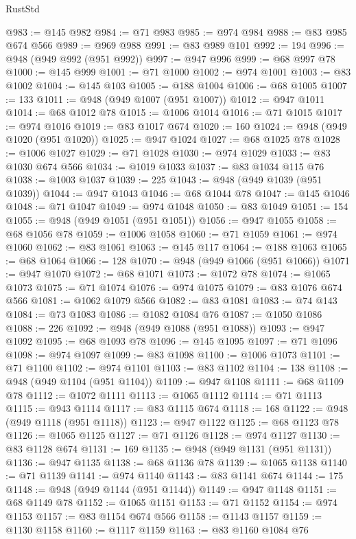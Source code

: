 \begin{lexlean}{RustStd}
\begin{coremodule}
{\begin{coremodule}
{{{{{{{{{{{{{{{{{{{{{{{{{{{{{{{{{{{@983 := @145 @982
@984 := @71 @983
@985 := @974 @984
@988 := @83 @985 @674 @566
@989 := @969 @988
@991 := @83 @989 @101
@992 := 194
@996 := @948 (@949 @992 (@951 @992))
@997 := @947 @996
@999 := @68 @997 @78
@1000 := @145 @999
@1001 := @71 @1000
@1002 := @974 @1001
@1003 := @83 @1002
@1004 := @145 @103
@1005 := @188 @1004
@1006 := @68 @1005
@1007 := 133
@1011 := @948 (@949 @1007 (@951 @1007))
@1012 := @947 @1011
@1014 := @68 @1012 @78
@1015 := @1006 @1014
@1016 := @71 @1015
@1017 := @974 @1016
@1019 := @83 @1017 @674
@1020 := 160
@1024 := @948 (@949 @1020 (@951 @1020))
@1025 := @947 @1024
@1027 := @68 @1025 @78
@1028 := @1006 @1027
@1029 := @71 @1028
@1030 := @974 @1029
@1033 := @83 @1030 @674 @566
@1034 := @1019 @1033
@1037 := @83 @1034 @115 @76
@1038 := @1003 @1037
@1039 := 225
@1043 := @948 (@949 @1039 (@951 @1039))
@1044 := @947 @1043
@1046 := @68 @1044 @78
@1047 := @145 @1046
@1048 := @71 @1047
@1049 := @974 @1048
@1050 := @83 @1049
@1051 := 154
@1055 := @948 (@949 @1051 (@951 @1051))
@1056 := @947 @1055
@1058 := @68 @1056 @78
@1059 := @1006 @1058
@1060 := @71 @1059
@1061 := @974 @1060
@1062 := @83 @1061
@1063 := @145 @117
@1064 := @188 @1063
@1065 := @68 @1064
@1066 := 128
@1070 := @948 (@949 @1066 (@951 @1066))
@1071 := @947 @1070
@1072 := @68 @1071
@1073 := @1072 @78
@1074 := @1065 @1073
@1075 := @71 @1074
@1076 := @974 @1075
@1079 := @83 @1076 @674 @566
@1081 := @1062 @1079 @566
@1082 := @83 @1081
@1083 := @74 @143
@1084 := @73 @1083
@1086 := @1082 @1084 @76
@1087 := @1050 @1086
@1088 := 226
@1092 := @948 (@949 @1088 (@951 @1088))
@1093 := @947 @1092
@1095 := @68 @1093 @78
@1096 := @145 @1095
@1097 := @71 @1096
@1098 := @974 @1097
@1099 := @83 @1098
@1100 := @1006 @1073
@1101 := @71 @1100
@1102 := @974 @1101
@1103 := @83 @1102
@1104 := 138
@1108 := @948 (@949 @1104 (@951 @1104))
@1109 := @947 @1108
@1111 := @68 @1109 @78
@1112 := @1072 @1111
@1113 := @1065 @1112
@1114 := @71 @1113
@1115 := @943 @1114
@1117 := @83 @1115 @674
@1118 := 168
@1122 := @948 (@949 @1118 (@951 @1118))
@1123 := @947 @1122
@1125 := @68 @1123 @78
@1126 := @1065 @1125
@1127 := @71 @1126
@1128 := @974 @1127
@1130 := @83 @1128 @674
@1131 := 169
@1135 := @948 (@949 @1131 (@951 @1131))
@1136 := @947 @1135
@1138 := @68 @1136 @78
@1139 := @1065 @1138
@1140 := @71 @1139
@1141 := @974 @1140
@1143 := @83 @1141 @674
@1144 := 175
@1148 := @948 (@949 @1144 (@951 @1144))
@1149 := @947 @1148
@1151 := @68 @1149 @78
@1152 := @1065 @1151
@1153 := @71 @1152
@1154 := @974 @1153
@1157 := @83 @1154 @674 @566
@1158 := @1143 @1157
@1159 := @1130 @1158
@1160 := @1117 @1159
@1163 := @83 @1160 @1084 @76
}}}}}}}}}}}}}}}}}}}}}}}}}}}}}}}}}}}
\end{coremodule}}
\end{coremodule}
\end{lexlean}
